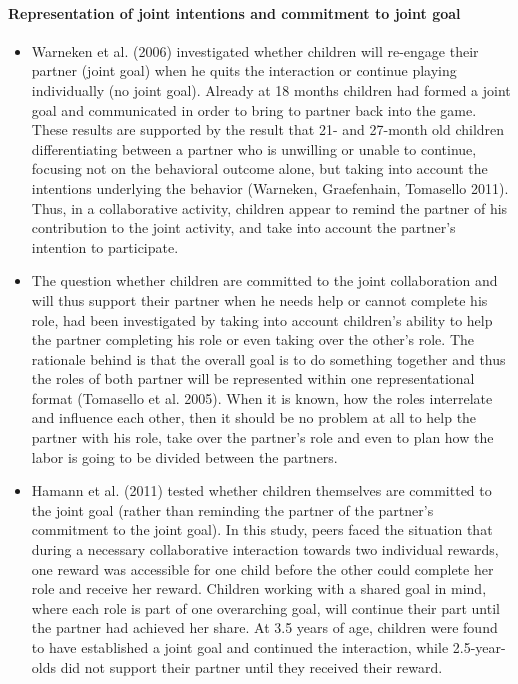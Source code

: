 \documentclass{article}
\begin{document}
\paragraph{Representation of joint intentions and commitment to joint goal}

\begin{itemize}

\item Warneken et al. (2006) investigated whether children will re-engage their
partner (joint goal) when he quits the interaction or continue playing
individually (no joint goal). Already at 18 months children had formed a joint
goal and communicated in order to bring to partner back into the game. These
results are supported by the result that 21- and 27-month old children
differentiating between a partner who is unwilling or unable to continue,
focusing not on the behavioral outcome alone, but taking into account the
intentions underlying the behavior (Warneken, Graefenhain, Tomasello 2011).
Thus, in a collaborative activity, children appear to remind the partner of his
contribution to the joint activity, and take into account the partner{}'s
intention to participate.

\item The question whether children are committed to the joint collaboration
and will thus support their partner when he needs help or cannot complete his
role, had been investigated by taking into account children{}'s ability to help
the partner completing his role or even taking over the other{}'s role. The
rationale behind is that the overall goal is to do something together and thus
the roles of both partner will be represented within one representational
format (Tomasello et al. 2005). When it is known, how the roles interrelate and
influence each other, then it should be no problem at all to help the partner
with his role, take over the partner{}'s role and even to plan how the labor is
going to be divided between the partners.

\item Hamann et al. (2011) tested whether children themselves are committed to
the joint goal (rather than reminding the partner of the partner{}'s commitment
to the joint goal). In this study, peers faced the situation that during a
necessary collaborative interaction towards two individual rewards, one reward
was accessible for one child before the other could complete her role and
receive her reward. Children working with a shared goal in mind, where each
role is part of one overarching goal, will continue their part until the
partner had achieved her share. At 3.5 years of age, children were found to
have established a joint goal and continued the interaction, while
2.5-year-olds did not support their partner until they received their reward.

\end{itemize}
\end{document}
